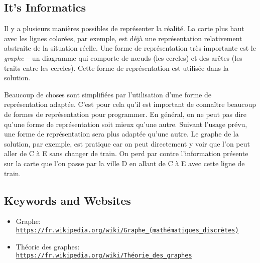 \documentclass[a4paper,11pt]{report}
\newcommand{\BrochureUrlText}[1]{\texttt{#1}}
\begin{document}
\subsection*{It’s Informatics}

Il y a plusieurs manières possibles de représenter la réalité. La carte plus haut avec les lignes colorées, par exemple, est déjà une représentation relativement abstraite de la situation réelle. Une forme de représentation très importante est le \emph{graphe} – un diagramme qui comporte de nœuds (les cercles) et des arêtes (les traits entre les cercles). Cette forme de représentation est utilisée dans la solution.

Beaucoup de choses sont simplifiées par l’utilisation d’une forme de représentation adaptée. C’est pour cela qu’il est important de connaître beaucoup de formes de représentation pour programmer. En général, on ne peut pas dire qu’une forme de représentation soit mieux qu’une autre. Suivant l’usage prévu, une forme de représentation sera plus adaptée qu’une autre. Le graphe de la solution, par exemple, est pratique car on peut directement y voir que l’on peut aller de C à E sans changer de train. On perd par contre l’information présente sur la carte que l’on passe par la ville D en allant de C à E avec cette ligne de train.

{\raggedright

\subsection*{Keywords and Websites}

\begin{itemize}
  \item Graphe: \href{https://fr.wikipedia.org/wiki/Graphe_(math\%C3\%A9matiques_discr\%C3\%A8tes)}{\BrochureUrlText{https://fr.wikipedia.org/wiki/Graphe\_(mathématiques\_discrètes)}}
  \item Théorie des graphes: \href{https://fr.wikipedia.org/wiki/Th\%C3\%A9orie_des_graphes}{\BrochureUrlText{https://fr.wikipedia.org/wiki/Théorie\_des\_graphes}}
\end{itemize}


}
\end{document}
